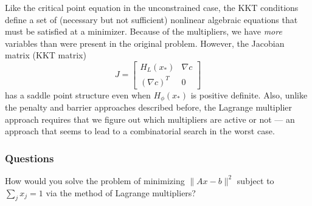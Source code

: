\documentclass[12pt, leqno]{article} %
\begin{document}
Like the critical point equation in the unconstrained case, the KKT
conditions define a set of (necessary but not sufficient) nonlinear
algebraic equations that must be satisfied at a minimizer. Because of
the multipliers, we have \emph{more} variables than were present in the
original problem. However, the Jacobian matrix (KKT matrix)
\[J = \begin{bmatrix}
    H_L(x_*) & \nabla c \\
    (\nabla c)^T & 0
  \end{bmatrix}\] has a saddle point structure even when \(H_\phi(x_*)\)
is positive definite. Also, unlike the penalty and barrier approaches
described before, the Lagrange multiplier approach requires that we
figure out which multipliers are active or not --- an approach that
seems to lead to a combinatorial search in the worst case.

\subsubsection{Questions}

How would you solve the problem of minimizing \(\|Ax-b\|^2\) subject to
\(\sum_j x_j = 1\) via the method of Lagrange multipliers?
\end{document}
